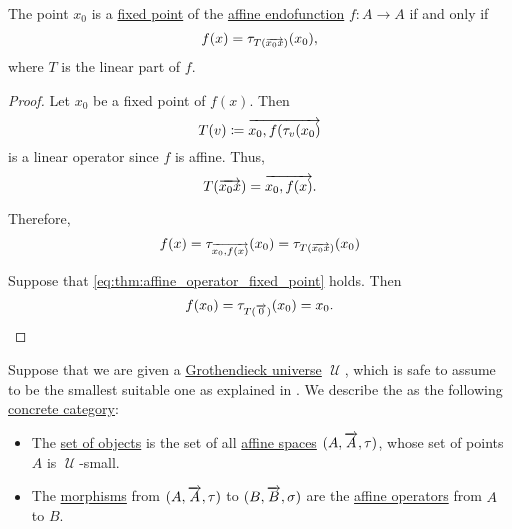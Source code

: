 \begin{proposition}\label{thm:affine_operator_fixed_point}
  The point \( x_0 \) is a \hyperref[def:fixed_point]{fixed point} of the \hyperref[def:affine_operator]{affine endofunction} \( f: A \to A \) if and only if
  \begin{equation}\label{eq:thm:affine_operator_fixed_point}
    f(x) = \tau_{T(\overrightarrow{x_0 x})}(x_0),
  \end{equation}
  where \( T \) is the linear part of \( f \).
\end{proposition}
\begin{proof}
  \SufficiencySubProof Let \( x_0 \) be a fixed point of \( f(x) \). Then
  \begin{equation*}
    T(v) \coloneqq \overrightarrow{x_0,f(\tau_v(x_0)}
  \end{equation*}
  is a linear operator since \( f \) is affine. Thus,
  \begin{equation*}
    T(\overrightarrow{x_0 x}) = \overrightarrow{x_0,f(x)}.
  \end{equation*}

  Therefore,
  \begin{equation*}
    f(x) = \tau_{\overrightarrow{x_0,f(x)}}(x_0) = \tau_{T(\overrightarrow{x_0 x})}(x_0)
  \end{equation*}

  \NecessitySubProof Suppose that \eqref{eq:thm:affine_operator_fixed_point} holds. Then
  \begin{equation*}
    f(x_0) = \tau_{T(\overrightarrow{0})}(x_0) = x_0.
  \end{equation*}
\end{proof}

\begin{definition}\label{def:category_of_small_affine_spaces}
  Suppose that we are given a \hyperref[def:grothendieck_universe]{Grothendieck universe} \( \mscrU \), which is safe to assume to be the smallest suitable one as explained in . We describe the  as the following \hyperref[rem:concrete_categories]{concrete category}:

  \begin{itemize}
    \item The \hyperref[def:category/objects]{set of objects} is the set of all \hyperref[def:affine_space]{affine spaces} \( (A, \overrightarrow{A}, \tau) \), whose set of points \( A \) is \( \mscrU \)-small.

    \item The \hyperref[def:category/morphisms]{morphisms} from \( (A, \overrightarrow{A}, \tau) \) to \( (B, \overrightarrow{B}, \sigma) \) are the \hyperref[def:affine_operator]{affine operators} from \( A \) to \( B \).
  \end{itemize}
\end{definition}


